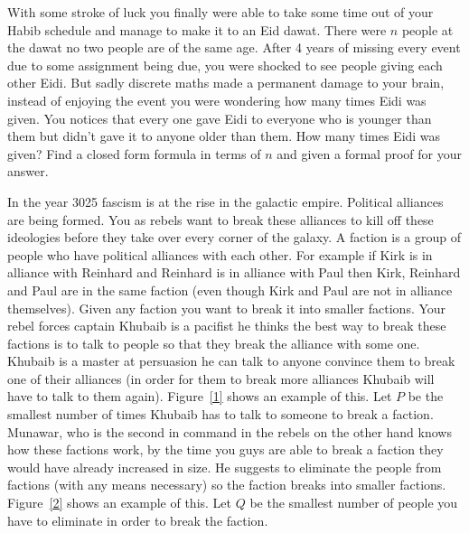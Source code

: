 \documentclass[a4paper]{exam}
\theoremstyle{claim}
\begin{document}
\begin{questions}
  \question With some stroke of luck you finally were able to take some time out of your Habib schedule and manage to make it to an Eid dawat. There were $n$ people at the dawat no two people are of the same age. After 4 years of missing every event due to some assignment being due, you were shocked to see people giving each other Eidi. But sadly discrete maths made a permanent damage to your brain, instead of enjoying the event you were wondering how many times Eidi was given. You notices that every one gave Eidi to everyone who is younger than them but didn't gave it to anyone older than them. How many times Eidi was given? Find a closed form formula in terms of $n$ and given a formal proof for your answer.
  \begin{solution}
  \end{solution}

    In the year 3025 fascism is at the rise in the galactic empire. Political alliances are being formed. You as rebels want to break these alliances to kill off these ideologies before they take over every corner of the galaxy. 
    A faction is a group of people who have political alliances with each other. For example if Kirk is in alliance with Reinhard and Reinhard is in alliance with Paul then Kirk, Reinhard and Paul are in the same faction (even though Kirk and Paul are not in alliance themselves). Given any faction you want to break it into smaller factions.
    Your rebel forces captain Khubaib is a pacifist he thinks the best way to break these factions is to talk to people so that they break the alliance with some one. Khubaib is a master at persuasion he can talk to anyone convince them to break one of their alliances (in order for them to break more alliances Khubaib will have to talk to them again). Figure~\ref{1} shows an example of this. 
    Let $P$ be the smallest number of times Khubaib has to talk to someone to break a faction. 
    Munawar, who is the second in command in the rebels on the other hand knows how these factions work, by the time you guys are able to break a faction they would have already increased in size. He suggests to eliminate the people from factions (with any means necessary) so the faction breaks into smaller factions. Figure~\ref{2} shows an example of this. 
    Let $Q$ be the smallest number of people you have to eliminate in order to break the faction. 


\end{questions}
\end{document}
